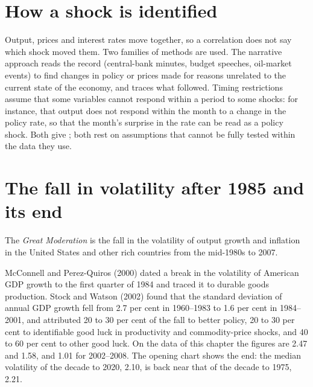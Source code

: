 \section{How a shock is identified}\label{sec:b2:business-cycles:identification}

Output, prices and interest rates move together, so a correlation does not say which shock moved them. Two families of
methods are used. The narrative approach reads the record (central-bank minutes, budget speeches, oil-market events) to
find changes in policy or prices made for reasons unrelated to the current state of the economy, and traces what followed.
Timing restrictions assume that some variables cannot respond within a period to some shocks: for instance, that output
does not respond within the month to a change in the policy rate, so that the month's surprise in the rate can be read as
a policy shock. Both give ; both rest on assumptions that cannot be fully tested within the data they use.

\section{The fall in volatility after 1985 and its end}\label{sec:b2:business-cycles:moderation}

\begin{definition}\label{def:b2:business-cycles:great-moderation}
The \emph{Great Moderation} is the fall in the volatility of output growth and inflation in the
United States and other rich countries from the mid-1980s to 2007.
\end{definition}

\begin{record}[The Great Moderation and its end]
McConnell and Perez-Quiros (2000) dated a break in the volatility of American GDP growth to the first quarter of 1984 and
traced it to durable goods production. Stock and Watson (2002) found that the standard deviation of annual GDP growth fell from 2.7 per cent in 1960--1983 to
1.6 per cent in 1984--2001, and attributed 20 to 30 per cent of the fall to better policy, 20 to 30 per cent to identifiable good luck in productivity
and commodity-price shocks, and 40 to 60 per cent to other good luck. On the data of this chapter the figures are 2.47 and 1.58, and 1.01 for 2002--2008.
The opening chart shows the end: the median volatility of the decade to 2020, 2.10, is back near that of the decade to
1975, 2.21.
\end{record}

